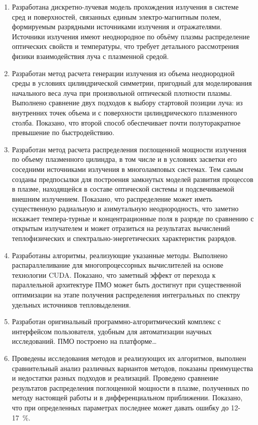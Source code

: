 \begin{enumerate}
	\item Разработана дискретно-лучевая модель прохождения излучения в системе сред и поверхностей, связанных единым электро-магнитным полем, формируемым разрядными источниками излучения и отражателями.
	Источники излучения имеют неоднородное по объёму плазмы распределение оптических свойств и температуры, что требует детального рассмотрения  физики  взаимодействия луча с плазменной средой.

	\item Разработан метод расчета генерации излучения из объема неоднородной среды в условиях цилиндрической симметрии, пригодный для моделирования начального веса луча при произвольной оптической плотности плазмы.
	Выполнено сравнение двух подходов к выбору стартовой позиции луча: из внутренних точек объема и с поверхности цилиндрического плазменного столба.
	Показано, что второй способ обеспечивает почти полуторакратное превышение по быстродействию.

	\item Разработан метод расчета распределения поглощенной мощности излучения по объему плазменного цилиндра, в том числе и в условиях засветки его соседними источниками излучения в многоламповых системах.
	Тем самым созданы предпосылки для построения замкнутых  моделей развития процессов в плазме, находящейся  в составе оптической системы и подсвечиваемой внешним излучением. Показано, что распределение может иметь существенную радиальную и азимутальную неоднородность, что заметно искажает темпера-турные и концентрационные поля в разряде по сравнению с открытым излучателем и может отразиться на результатах вычислений теплофизических и спектрально-энергетических характеристик разрядов.

	\item Разработаны алгоритмы, реализующие указанные методы.
	Выполнено распараллеливание для многопроцессорных вычислителей на основе технологии CUDA.
	Показано, что заметный эффект от перехода к параллельной архитектуре ПМО может быть достигнут при существенной оптимизации на этапе получения распределения интегральных по спектру удельных источников тепловыделения.

	\item Разработан оригинальный программно-алгоритмический комплекс с интерфейсом пользователя, удобным для автоматизации научных исследований.
	ПМО построено на платформе…

	\item Проведены исследования методов и реализующих их алгоритмов, выполнен сравнительный анализ различных вариантов методов, показаны преимущества и недостатки разных подходов и реализаций.
	Проведено сравнение результатов распределения поглощенной мощности в плазме, полученных по методу настоящей работы и в дифференциальном приближении.
	Показано, что при определенных параметрах последнее может давать ошибку до 12-17~\%.


\end{enumerate}
